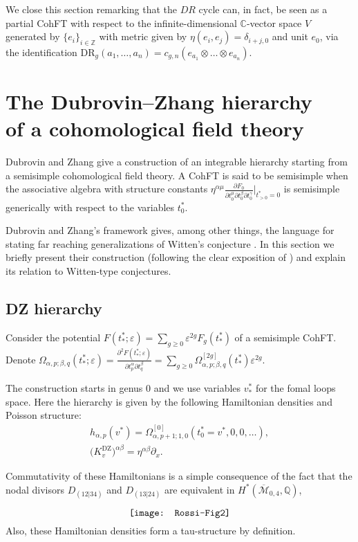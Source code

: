 \documentclass[pdftex]{sigma}
\numberwithin{equation}{section}
\newcommand{\mbZ}{\mathbb Z}
\newcommand{\mbC}{\mathbb C}
\newcommand{\oM}{\overline{\mathcal M}}
\def\mbQ{{\mathbb Q}}
\def\d{{\partial}}
\newcommand{\<}{\left<}
\renewcommand{\>}{\right>}
\newcommand{\eps}{\varepsilon}
\newcommand{\DR}{\mathrm{DR}}
\newcommand{\DZ}{\mathrm{DZ}}
\begin{document}
We close this section remarking that the $DR$ cycle can, in fact, be seen as a partial CohFT with respect to the inf\/inite-dimensional $\mbC$-vector space $V$ generated by $\{e_i\}_{i\in \mbZ}$ with metric given by $\eta(e_i,e_j) = \delta_{i+j,0}$ and unit $e_0$, via the identif\/ication $\DR_g(a_1,\dots,a_n) = c_{g,n}(e_{a_1}\otimes\dots\otimes e_{a_n})$.

\section[The Dubrovin--Zhang hierarchy of a cohomological f\/ield theory]{The Dubrovin--Zhang hierarchy\\ of a cohomological f\/ield theory}

Dubrovin and Zhang \cite{DZ05} give a construction of an integrable hierarchy starting from a semisimple cohomological f\/ield theory. A CohFT is said to be semisimple when the associative algebra with structure constants $\eta^{\alpha \mu} \frac{\d F_0}{\d t^\mu_0 \d t^\beta_0 \d t^\gamma_0}\big|_{t^*_{>0}=0} $ is semisimple generically with respect to the variables $t^*_0$.

Dubrovin and Zhang's framework gives, among other things, the language for stating far reaching generalizations of Witten's conjecture \cite{Wit91}. In this section we brief\/ly present their construction (following the clear exposition of \cite{BPS12a,BPS12b}) and explain its relation to Witten-type conjectures.

\subsection{DZ hierarchy} Consider the potential $F(t^*_*;\eps)=\sum\limits_{g\ge 0}\eps^{2g}F_g(t^*_*)$ of a semisimple CohFT. Denote $\Omega_{\alpha,p;\beta,q}(t^*_*;\eps)= \frac{\d^2 F(t^*_*;\eps)}{\d t^\alpha_p \d t^\beta_q } =\sum\limits_{g \ge 0} \Omega^{[2g]}_{\alpha,p;\beta,q}(t^*_*) \eps^{2g}$.

The construction starts in genus $0$ and we use variables $v^*_*$ for the fomal loops space. Here the hierarchy is given by the following Hamiltonian densities and Poisson structure:
\begin{gather*} h_{\alpha,p}(v^*) = \Omega^{[0]}_{\alpha,p+1;1,0}(t^*_0=v^*,0,0,\dots),\\
\big(K^{\DZ}_v\big)^{\alpha\beta}=\eta^{\alpha\beta}\d_x.
\end{gather*}

Commutativity of these Hamiltonians is a simple consequence of the fact that the nodal divisors $D_{(12|34)}$ and $D_{(13|24)}$ are equivalent in $H^*(\oM_{0,4},\mbQ)$,
\begin{gather*}
\raisebox{-0.42\height}{\texttt{[image: Rossi-Fig2]}}
\end{gather*}
Also, these Hamiltonian densities form a tau-structure by def\/inition.
\end{document}
